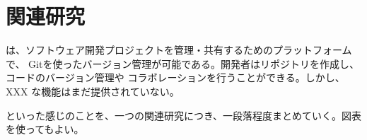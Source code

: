 \documentclass[main]{subfiles}
\begin{document}
\chapter{関連研究}
\label{cha:related}

\cite{Github} は、ソフトウェア開発プロジェクトを管理・共有するためのプラットフォームで、
Gitを使ったバージョン管理が可能である。開発者はリポジトリを作成し、コードのバージョン管理や
コラボレーションを行うことができる。しかし、XXX な機能はまだ提供されていない。

といった感じのことを、一つの関連研究につき、一段落程度まとめていく。図表を使ってもよい。
\end{document}
